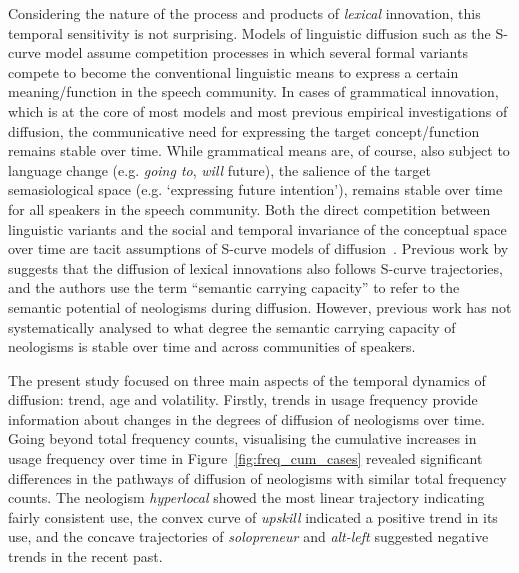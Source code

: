 \documentclass[
  a4paper,
  abstract=on,
  captions=tableabove,
  ]{scrartcl}
\newcommand{\ol}[1]{\emph{#1}}
\newcommand{\mn}[1]{`{#1}'}
\begin{document}
    Considering the nature of the process and products of \emph{lexical} innovation, this temporal sensitivity is not surprising. Models of linguistic diffusion such as the S-curve model assume competition processes in which several formal variants compete to become the conventional linguistic means to express a certain meaning/function in the speech community. In cases of grammatical innovation, which is at the core of most models and most previous empirical investigations of diffusion, the communicative need for expressing the target concept/function remains stable over time. While grammatical means are, of course, also subject to language change (e.g. \ol{going to}, \ol{will} future), the salience of the target semasiological space (e.g. \mn{expressing future intention}), remains stable over time for all speakers in the speech community. Both the direct competition between linguistic variants and the social and temporal invariance of the conceptual space over time are tacit assumptions of S-curve models of diffusion~\parencite{Blythe2012ScurvesMechanisms}. Previous work by \textcite{Nini2017ApplicationGrowth} suggests that the diffusion of lexical innovations also follows S-curve trajectories, and the authors use the term \enquote{semantic carrying capacity} to refer to the semantic potential of neologisms during diffusion. However, previous work has not systematically analysed to what degree the semantic carrying capacity of neologisms is stable over time and across communities of speakers.

    The present study focused on three main aspects of the temporal dynamics of diffusion: trend, age and volatility. Firstly, trends in usage frequency provide information about changes in the degrees of diffusion of neologisms over time. Going beyond total frequency counts, visualising the cumulative increases in usage frequency over time in Figure~\ref{fig:freq_cum_cases} revealed significant differences in the pathways of diffusion of neologisms with similar total frequency counts. The neologism \ol{hyperlocal} showed the most linear trajectory indicating fairly consistent use, the convex curve of \ol{upskill} indicated a positive trend in its use, and the concave trajectories of \ol{solopreneur} and \ol{alt-left} suggested negative trends in the recent past.

\end{document}
